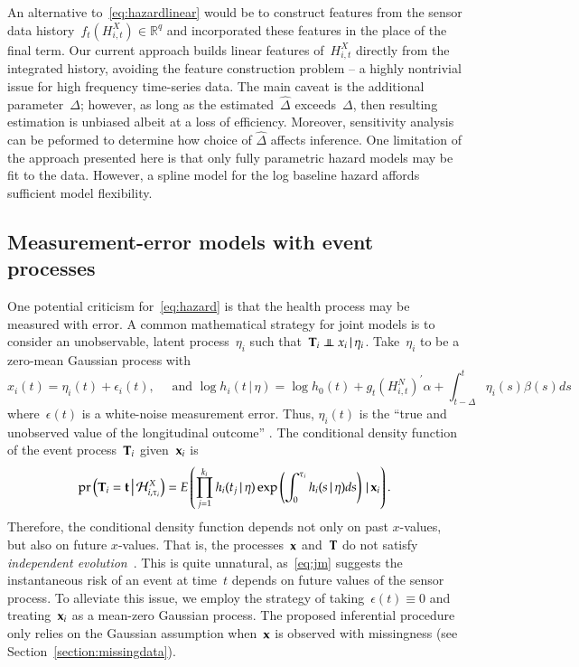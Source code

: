 \documentclass[11pt]{amsart}
\def\pr{\mathop{\text{pr}}\nolimits}
\def\pr{\mathop{\text{pr}}\nolimits}
\def\indep{\mathrel{\rlap{$\perp$}\kern1.6pt\mathord{\perp}}}
\def\H{\mathcal{H}}
\def\given{\, | \,}
\def\Given{\, \big | \,}
\def\bft{{\bf t}}
\def\bfx{{\bf x}}
\def\bfT{{\bf T}}
\begin{document}
An alternative to~\eqref{eq:hazardlinear} would be to construct
features from the sensor data history~$f_t ( H_{i,t}^{X}) \in
\mathbb{R}^q$ and incorporated these features in the place of the
final term. Our current approach builds linear features of~$H_{i,t}^X$
directly from the integrated history, avoiding the feature
construction problem -- a highly nontrivial issue for high frequency
time-series data.  The main caveat is the additional
parameter~$\Delta$; however, as long as the estimated~$\hat \Delta$
exceeds~$\Delta$, then resulting estimation is unbiased albeit at a
loss of efficiency.  Moreover, sensitivity analysis can be peformed to
determine how choice of $\hat \Delta$ affects inference.  One
limitation of the approach presented here is that only fully
parametric hazard models may be fit to the data. However, a spline
model for the log baseline hazard affords sufficient model
flexibility. 

\subsection{Measurement-error models with event processes}
\label{section:memproblems}

One potential criticism for~\eqref{eq:hazard} is that the health
process may be measured with error.  
A common mathematical strategy for joint models is to consider an
unobservable, latent process~$\eta_i$ such that~$\bfT_i \indep x_i
\given \eta_i$. Take~$\eta_i$ to be a zero-mean Gaussian process with 
\begin{equation}\label{eq:jm}
x_i(t) = \eta_i (t) + \epsilon_i (t),\quad \text{ and } \log h_i (t
\given \eta ) = \log h_0 (t) + g_t \left( H_{i,t}^N \right)^{\prime}
\alpha + \int_{t-\Delta}^t \eta_i (s) \beta (s) ds
\end{equation}
where~$\epsilon (t)$ is a white-noise measurement error. Thus,
$\eta_i (t)$ is the ``true and unobserved value of the longitudinal
outcome'' \citep[Sec. 2.1, pp.3]{Rizopoulos2010}. The conditional
density function of the event process~$\bfT_i$ given~$\bfx_i$ is 
\[
\pr \left ( \bfT_i = \bft \Given \H_{i,\tau_i}^X \right) = E \left(
  \prod_{j=1}^{k_i} h_i (t_j \given \eta) \exp \left(
    \int_{0}^{\tau_i} h_i (s \given \eta ) ds \right) \given \bfx_i \right).
\]
Therefore, the conditional density function depends not only on past
$x$-values, but also on future $x$-values.
That is, the processes~$\bfx$ and~$\bfT$ do not satisfy
\emph{independent evolution}~\citep{DempseyPMCC2}. 
This is quite unnatural, as~\eqref{eq:jm} suggests the instantaneous
risk of an event at time~$t$ depends on future values of the sensor
process. To alleviate this issue, we employ the strategy of
taking~$\epsilon (t) \equiv 0$ and treating~$\bfx_i$ as a mean-zero
Gaussian process. The proposed inferential procedure only relies on
the Gaussian assumption when~$\bfx$ is observed with missingness (see 
Section~\ref{section:missingdata}).
\end{document}
